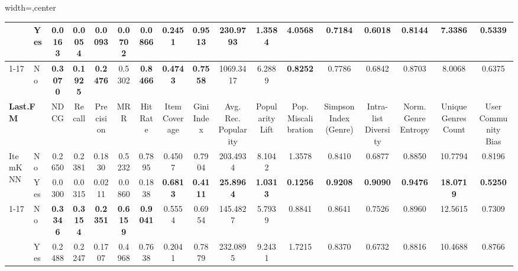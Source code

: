 \documentclass{article}
\begin{document}
\begin{table}[htbp]
\begin{adjustbox}{width=\textwidth,center}
\begin{tabular}{llccccccccccccccc}
 & Yes & \cellcolor{red!40} 0.0163 & \cellcolor{red!40} 0.0054 & \cellcolor{red!40} 0.0093 & \cellcolor{red!40} 0.0702 & \cellcolor{red!40} 0.0866 & \cellcolor{red!40} 0.2451 & \cellcolor{red!40} 0.9513 & \textbf{\cellcolor{green!40} 230.9793} & \textbf{\cellcolor{green!40} 1.3584} & \cellcolor{red!40} 4.0568 & \cellcolor{red!40} 0.7184 & \cellcolor{red!40} 0.6018 & \cellcolor{red!40} 0.8144 & \cellcolor{red!40} 7.3386 & \textbf{\cellcolor{green!40} 0.5339} \\
\cmidrule{1-17}
\multirow{2}{*}{LightGCN} & No & \textbf{0.3070} & \textbf{0.1925} & \textbf{0.2476} & 0.5302 & \textbf{0.8466} & \textbf{0.4743} & \textbf{0.7558} & 1069.3417 & 6.2889 & \textbf{0.8252} & 0.7786 & 0.6842 & 0.8703 & 8.0068 & 0.6375 \\
\midrule\midrule
\multicolumn{2}{l}{\textbf{Last.FM}} & NDCG & Recall & Precision & MRR & Hit Rate & Item Coverage & Gini Index & Avg. Rec. Popularity & Popularity Lift & Pop. Miscalibration & Simpson Index (Genre) & Intra-list Diversity & Norm. Genre Entropy & Unique Genres Count & User Community Bias \\
\midrule
\multirow{2}{*}{ItemKNN} & No & 0.2650 & 0.2381 & 0.1830 & 0.5232 & 0.7895 & 0.4507 & 0.7904 & 203.4934 & 8.1042 & 1.3578 & 0.8410 & 0.6877 & 0.8850 & 10.7794 & 0.8196 \\
 & Yes & \cellcolor{red!40} 0.0300 & \cellcolor{red!40} 0.0315 & \cellcolor{red!40} 0.0211 & \cellcolor{red!40} 0.0860 & \cellcolor{red!40} 0.1838 & \textbf{\cellcolor{green!40} 0.6813} & \textbf{\cellcolor{green!40} 0.4111} & \textbf{\cellcolor{green!40} 25.8964} & \textbf{\cellcolor{green!40} 1.0313} & \textbf{\cellcolor{green!40} 0.1256} & \textbf{\cellcolor{green!40} 0.9208} & \textbf{\cellcolor{green!40} 0.9090} & \textbf{\cellcolor{green!40} 0.9476} & \textbf{\cellcolor{green!40} 18.0719} & \textbf{\cellcolor{green!40} 0.5250} \\
\cmidrule{1-17}
\multirow{2}{*}{LightGCN} & No & \textbf{0.3346} & \textbf{0.3154} & \textbf{0.2351} & \textbf{0.6159} & \textbf{0.9041} & 0.5554 & 0.6954 & 145.4827 & 5.7939 & 0.8841 & 0.8641 & 0.7526 & 0.8960 & 12.5615 & 0.7309 \\
 & Yes & \cellcolor{red!40} 0.2488 & \cellcolor{red!40} 0.2247 & \cellcolor{red!40} 0.1707 & \cellcolor{red!40} 0.4968 & \cellcolor{red!40} 0.7638 & \cellcolor{red!40} 0.2041 & \cellcolor{red!40} 0.7879 & \cellcolor{red!40} 232.0895 & \cellcolor{red!40} 9.2431 & \cellcolor{red!40} 1.7215 & \cellcolor{red!20} 0.8370 & \cellcolor{red!40} 0.6732 & \cellcolor{red!20} 0.8816 & \cellcolor{red!40} 10.4688 & \cellcolor{red!40} 0.8766 \\
\bottomrule
\end{tabular}
\end{adjustbox}
\end{table}
\end{document}
